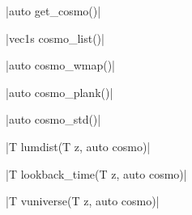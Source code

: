 \funcitem \cppinline|auto get_cosmo()| 

\cppinline|vec1s cosmo_list()| 

\cppinline|auto cosmo_wmap()| 

\cppinline|auto cosmo_plank()| 

\cppinline|auto cosmo_std()| 

\funcitem \vectorfunc \cppinline|T lumdist(T z, auto cosmo)| 

\funcitem \vectorfunc \cppinline|T lookback_time(T z, auto cosmo)| 

\funcitem \vectorfunc \cppinline|T vuniverse(T z, auto cosmo)| 
